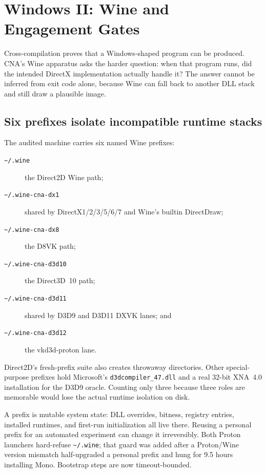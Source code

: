 \chapter{Windows II: Wine and Engagement Gates}
\label{ch:wine-engagement}

Cross-compilation proves that a Windows-shaped program can be produced. CNA's Wine apparatus
asks the harder question: when that program runs, did the intended DirectX implementation
actually handle it? The answer cannot be inferred from exit code alone, because Wine can fall
back to another DLL stack and still draw a plausible image.



\section{Six prefixes isolate incompatible runtime stacks}

The audited machine carries six named Wine prefixes:

\begin{description}
  \item[\texttt{\textasciitilde/.wine}] the Direct2D Wine path;
  \item[\texttt{\textasciitilde/.wine-cna-dx1}] shared by DirectX1/2/3/5/6/7 and Wine's
  builtin DirectDraw;
  \item[\texttt{\textasciitilde/.wine-cna-dx8}] the D8VK path;
  \item[\texttt{\textasciitilde/.wine-cna-d3d10}] the Direct3D~10 path;
  \item[\texttt{\textasciitilde/.wine-cna-d3d11}] shared by D3D9 and D3D11 DXVK lanes; and
  \item[\texttt{\textasciitilde/.wine-cna-d3d12}] the vkd3d-proton lane.
\end{description}

Direct2D's fresh-prefix suite also creates throwaway directories. Other special-purpose prefixes
hold Microsoft's \texttt{d3dcompiler\_47.dll} and a real 32-bit XNA~4.0 installation for the
D3D9 oracle. Counting only three because three roles are memorable would lose the actual
runtime isolation on disk.

A prefix is mutable system state: DLL overrides, bitness, registry entries, installed runtimes,
and first-run initialization all live there. Reusing a personal prefix for an automated
experiment can change it irreversibly. Both Proton launchers hard-refuse
\texttt{\textasciitilde/.wine}; that guard was added after a Proton/Wine version mismatch
half-upgraded a personal prefix and hung for 9.5 hours installing Mono. Bootstrap steps are now
timeout-bounded.

